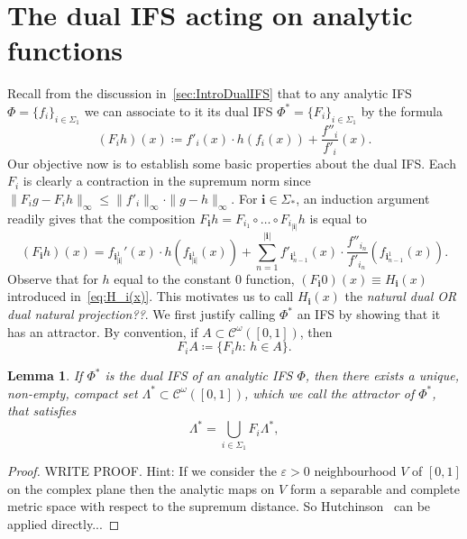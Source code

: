 \documentclass[12pt,]{article}
\newtheorem{lemma}[theorem]{Lemma}
\theoremstyle{definition}
\theoremstyle{remark}
\newcommand{\0}{\mathbf{0}}
\newcommand{\bi}{\mathbf{i}}
\begin{document}
{%
\section{The dual IFS acting on analytic functions}\label{sec:DualIFSFull}

Recall from the discussion in~\cref{sec:IntroDualIFS} that to any analytic IFS $\Phi=\{f_i\}_{i\in\Sigma_1}$ we can associate to it its dual IFS $\Phi^*=\{F_i\}_{i\in\Sigma_1}$ by the formula
\begin{equation}\label{eq:LiftedIFS}
	(F_i h)(x)\coloneqq f'_i(x)\cdot h(f_i(x)) + \frac{f''_i}{f'_i}(x).
\end{equation}
Our objective now is to establish some basic properties about the dual IFS. Each $F_i$ is clearly a contraction in the supremum norm since $\|F_ig-F_ih\|_{\infty}\leq \|f'_i\|_{\infty}\cdot \|g-h\|_{\infty}$. For $\bi\in\Sigma_*$, an induction argument readily gives that the composition $F_{\bi}h=F_{i_1}\circ\ldots\circ F_{i_{|\bi|}}h$ is equal to
\begin{equation}\label{eq:IteratesLiftedIFS}
	(F_{\bi}h)(x) = f_{\bi_{|\bi|}^1}'(x)\cdot h(f_{\bi_{|\bi|}^1}(x)) + \sum_{n=1}^{|\bi|} f'_{\bi_{n-1}^1}(x) \cdot 
	\frac{f''_{i_n}}{f'_{i_n}}(f_{\bi_{n-1}^1}(x)).
\end{equation}
Observe that for $h$ equal to the constant $0$ function, $(F_{\bi}0)(x)\equiv H_{\bi}(x)$ introduced in~\cref{eq:H_i(x)}. This motivates us to call $H_{\bi}(x)$ the {\color{red} \emph{natural dual OR dual natural projection??}.} We first justify calling $\Phi^*$ an IFS by showing that it has an attractor. By convention, if $A\subset \mathcal{C}^{\omega}([0,1])$, then
\begin{equation*}
F_iA \coloneqq \{F_i h:\, h\in A\}.
\end{equation*}
\begin{lemma}\label{lem:ExistanceAttractor}
If $\Phi^*$ is the dual IFS of an analytic IFS $\Phi$, then there exists a unique, non-empty, compact set $\Lambda^*\subset \mathcal{C}^{\omega}([0,1])$, which we call the \emph{attractor} of $\Phi^*$, that satisfies
\begin{equation*}
\Lambda^*=\bigcup_{i\in\Sigma_1} F_i\Lambda^*,
\end{equation*} 
\end{lemma} 
\begin{proof}
{\color{red} WRITE PROOF. Hint: If we consider the $\varepsilon>0$ neighbourhood $V$ of $[0,1]$ on the complex plane then the analytic maps on $V$ form a separable and complete metric space with respect to the supremum distance. So Hutchinson~\cite{Hutchinson_Attractor_81} can be applied directly...}
\end{proof}

}
\end{document}
